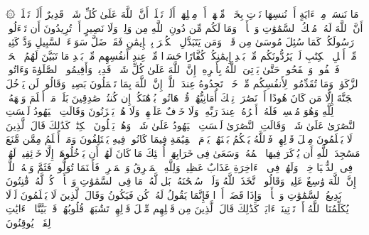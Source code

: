\stopbuffer%
\startbuffer[\q:2:106]
۞ مَا نَنسَخۡ مِنۡ ءَایَةٍ أَوۡ نُنسِهَا نَأۡتِ بِخَیۡرࣲ مِّنۡهَاۤ أَوۡ مِثۡلِهَاۤۗ أَلَمۡ تَعۡلَمۡ أَنَّ ٱللَّهَ عَلَىٰ كُلِّ شَیۡءࣲ قَدِیرٌ%
\stopbuffer%
\startbuffer[\q:2:107]
أَلَمۡ تَعۡلَمۡ أَنَّ ٱللَّهَ لَهُۥ مُلۡكُ ٱلسَّمَٰوَٰتِ وَٱلۡأَرۡضِۗ وَمَا لَكُم مِّن دُونِ ٱللَّهِ مِن وَلِیࣲّ وَلَا نَصِیرٍ%
\stopbuffer%
\startbuffer[\q:2:108]
أَمۡ تُرِیدُونَ أَن تَسۡءَلُوا۟ رَسُولَكُمۡ كَمَا سُئِلَ مُوسَىٰ مِن قَبۡلُۗ وَمَن یَتَبَدَّلِ ٱلۡكُفۡرَ بِٱلۡإِیمَٰنِ فَقَدۡ ضَلَّ سَوَاۤءَ ٱلسَّبِیلِ%
\stopbuffer%
\startbuffer[\q:2:109]
وَدَّ كَثِیرࣱ مِّنۡ أَهۡلِ ٱلۡكِتَٰبِ لَوۡ یَرُدُّونَكُم مِّنۢ بَعۡدِ إِیمَٰنِكُمۡ كُفَّارًا حَسَدࣰا مِّنۡ عِندِ أَنفُسِهِم مِّنۢ بَعۡدِ مَا تَبَیَّنَ لَهُمُ ٱلۡحَقُّۖ فَٱعۡفُوا۟ وَٱصۡفَحُوا۟ حَتَّىٰ یَأۡتِیَ ٱللَّهُ بِأَمۡرِهِۦۤۗ إِنَّ ٱللَّهَ عَلَىٰ كُلِّ شَیۡءࣲ قَدِیرࣱ%
\stopbuffer%
\startbuffer[\q:2:110]
وَأَقِیمُوا۟ ٱلصَّلَوٰةَ وَءَاتُوا۟ ٱلزَّكَوٰةَۚ وَمَا تُقَدِّمُوا۟ لِأَنفُسِكُم مِّنۡ خَیۡرࣲ تَجِدُوهُ عِندَ ٱللَّهِۗ إِنَّ ٱللَّهَ بِمَا تَعۡمَلُونَ بَصِیرࣱ%
\stopbuffer%
\startbuffer[\q:2:111]
وَقَالُوا۟ لَن یَدۡخُلَ ٱلۡجَنَّةَ إِلَّا مَن كَانَ هُودًا أَوۡ نَصَٰرَىٰۗ تِلۡكَ أَمَانِیُّهُمۡۗ قُلۡ هَاتُوا۟ بُرۡهَٰنَكُمۡ إِن كُنتُمۡ صَٰدِقِینَ%
\stopbuffer%
\startbuffer[\q:2:112]
بَلَىٰۚ مَنۡ أَسۡلَمَ وَجۡهَهُۥ لِلَّهِ وَهُوَ مُحۡسِنࣱ فَلَهُۥۤ أَجۡرُهُۥ عِندَ رَبِّهِۦ وَلَا خَوۡفٌ عَلَیۡهِمۡ وَلَا هُمۡ یَحۡزَنُونَ%
\stopbuffer%
\startbuffer[\q:2:113]
وَقَالَتِ ٱلۡیَهُودُ لَیۡسَتِ ٱلنَّصَٰرَىٰ عَلَىٰ شَیۡءࣲ وَقَالَتِ ٱلنَّصَٰرَىٰ لَیۡسَتِ ٱلۡیَهُودُ عَلَىٰ شَیۡءࣲ وَهُمۡ یَتۡلُونَ ٱلۡكِتَٰبَۗ كَذَٰلِكَ قَالَ ٱلَّذِینَ لَا یَعۡلَمُونَ مِثۡلَ قَوۡلِهِمۡۚ فَٱللَّهُ یَحۡكُمُ بَیۡنَهُمۡ یَوۡمَ ٱلۡقِیَٰمَةِ فِیمَا كَانُوا۟ فِیهِ یَخۡتَلِفُونَ%
\stopbuffer%
\startbuffer[\q:2:114]
وَمَنۡ أَظۡلَمُ مِمَّن مَّنَعَ مَسَٰجِدَ ٱللَّهِ أَن یُذۡكَرَ فِیهَا ٱسۡمُهُۥ وَسَعَىٰ فِی خَرَابِهَاۤۚ أُو۟لَٰۤئِكَ مَا كَانَ لَهُمۡ أَن یَدۡخُلُوهَاۤ إِلَّا خَاۤئِفِینَۚ لَهُمۡ فِی ٱلدُّنۡیَا خِزۡیࣱ وَلَهُمۡ فِی ٱلۡءَاخِرَةِ عَذَابٌ عَظِیمࣱ%
\stopbuffer%
\startbuffer[\q:2:115]
وَلِلَّهِ ٱلۡمَشۡرِقُ وَٱلۡمَغۡرِبُۚ فَأَیۡنَمَا تُوَلُّوا۟ فَثَمَّ وَجۡهُ ٱللَّهِۚ إِنَّ ٱللَّهَ وَٰسِعٌ عَلِیمࣱ%
\stopbuffer%
\startbuffer[\q:2:116]
وَقَالُوا۟ ٱتَّخَذَ ٱللَّهُ وَلَدࣰاۗ سُبۡحَٰنَهُۥۖ بَل لَّهُۥ مَا فِی ٱلسَّمَٰوَٰتِ وَٱلۡأَرۡضِۖ كُلࣱّ لَّهُۥ قَٰنِتُونَ%
\stopbuffer%
\startbuffer[\q:2:117]
بَدِیعُ ٱلسَّمَٰوَٰتِ وَٱلۡأَرۡضِۖ وَإِذَا قَضَىٰۤ أَمۡرࣰا فَإِنَّمَا یَقُولُ لَهُۥ كُن فَیَكُونُ%
\stopbuffer%
\startbuffer[\q:2:118]
وَقَالَ ٱلَّذِینَ لَا یَعۡلَمُونَ لَوۡلَا یُكَلِّمُنَا ٱللَّهُ أَوۡ تَأۡتِینَاۤ ءَایَةࣱۗ كَذَٰلِكَ قَالَ ٱلَّذِینَ مِن قَبۡلِهِم مِّثۡلَ قَوۡلِهِمۡۘ تَشَٰبَهَتۡ قُلُوبُهُمۡۗ قَدۡ بَیَّنَّا ٱلۡءَایَٰتِ لِقَوۡمࣲ یُوقِنُونَ%
